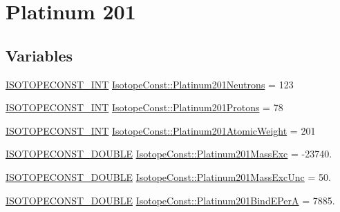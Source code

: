 \hypertarget{group___isotope_const-_platinum-_pt201}{}\section{Platinum 201}
\label{group___isotope_const-_platinum-_pt201}
\subsection*{Variables}
\begin{DoxyCompactItemize}
\item 
\mbox{\hyperlink{group___isotope_const-_macros_ga5f18360b3e99483a35c32d789e62621c}{I\+S\+O\+T\+O\+P\+E\+C\+O\+N\+S\+T\+\_\+\+I\+NT}} \mbox{\hyperlink{group___isotope_const-_platinum-_pt201_gad2c61f68b4e41773458089a204506970}{Isotope\+Const\+::\+Platinum201\+Neutrons}} = 123
\item 
\mbox{\hyperlink{group___isotope_const-_macros_ga5f18360b3e99483a35c32d789e62621c}{I\+S\+O\+T\+O\+P\+E\+C\+O\+N\+S\+T\+\_\+\+I\+NT}} \mbox{\hyperlink{group___isotope_const-_platinum-_pt201_ga6f267baedd71ef5adff9428fd82899e9}{Isotope\+Const\+::\+Platinum201\+Protons}} = 78
\item 
\mbox{\hyperlink{group___isotope_const-_macros_ga5f18360b3e99483a35c32d789e62621c}{I\+S\+O\+T\+O\+P\+E\+C\+O\+N\+S\+T\+\_\+\+I\+NT}} \mbox{\hyperlink{group___isotope_const-_platinum-_pt201_gad63b206dbfcaa5f025e441d12e67b800}{Isotope\+Const\+::\+Platinum201\+Atomic\+Weight}} = 201
\item 
\mbox{\hyperlink{group___isotope_const-_macros_ga8f45a7272ce02c0b4c65c44636ed719a}{I\+S\+O\+T\+O\+P\+E\+C\+O\+N\+S\+T\+\_\+\+D\+O\+U\+B\+LE}} \mbox{\hyperlink{group___isotope_const-_platinum-_pt201_gae0eefd1d31d27a594db15591f521ce8a}{Isotope\+Const\+::\+Platinum201\+Mass\+Exc}} = -\/23740.
\item 
\mbox{\hyperlink{group___isotope_const-_macros_ga8f45a7272ce02c0b4c65c44636ed719a}{I\+S\+O\+T\+O\+P\+E\+C\+O\+N\+S\+T\+\_\+\+D\+O\+U\+B\+LE}} \mbox{\hyperlink{group___isotope_const-_platinum-_pt201_ga79c4ed08525e554a9beccf61179200ba}{Isotope\+Const\+::\+Platinum201\+Mass\+Exc\+Unc}} = 50.
\item 
\mbox{\hyperlink{group___isotope_const-_macros_ga8f45a7272ce02c0b4c65c44636ed719a}{I\+S\+O\+T\+O\+P\+E\+C\+O\+N\+S\+T\+\_\+\+D\+O\+U\+B\+LE}} \mbox{\hyperlink{group___isotope_const-_platinum-_pt201_ga6adaf23ba94811c66b77313e54f1426f}{Isotope\+Const\+::\+Platinum201\+Bind\+E\+PerA}} = 7885.
\item 

\end{DoxyCompactItemize}
